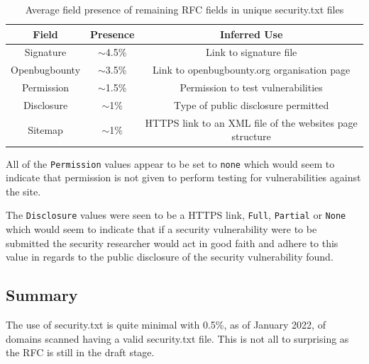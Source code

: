 \documentclass{mscreport}
\begin{document}
\begin{table}[H]
  \begin{center}
    \begin{tabular}{|c|c|c|}  %
      \hline
      \textbf{Field} & \textbf{Presence} & \textbf{Inferred Use}\\
      \hline
      Signature & $\sim$4.5\% & Link to signature file\\
      \hline
      Openbugbounty & $\sim$3.5\% & Link to openbugbounty.org organisation page\\
      \hline
      Permission & $\sim$1.5\% & Permission to test vulnerabilities\\
      \hline
      Disclosure & $\sim$1\% & Type of public disclosure permitted\\
      \hline
      Sitemap & $\sim$1\% & HTTPS link to an XML file of the websites page structure\\
      \hline
    \end{tabular}
    \caption{Average field presence of remaining RFC fields in unique security.txt files}
    \label{table:security_txt_by_non_rfc_fields} %
  \end{center}
\end{table}

\noindent
All of the \texttt{Permission} values appear to be set to \texttt{none} which would seem to indicate that permission is not given to perform testing for vulnerabilities against the site.

\vspace{0.3cm} \noindent
The \texttt{Disclosure} values were seen to be a HTTPS link, \texttt{Full}, \texttt{Partial} or \texttt{None} which would seem to indicate that if a security vulnerability were to be submitted the security researcher would act in good faith and adhere to this value in regards to the public disclosure of the security vulnerability found.

\subsection{Summary}

\noindent
The use of security.txt is quite minimal with 0.5\%, as of January 2022, of domains scanned having a valid security.txt file. This is not all to surprising as the RFC is still in the draft stage.
\end{document}
